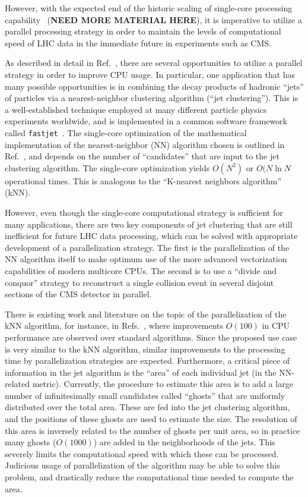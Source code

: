 \documentclass[12pt]{article}
\begin{document}
However, with the expected end of the historic scaling of single-core
processing capability~\cite{bergman2008exascale} ({\bf NEED MORE
  MATERIAL HERE}), it is imperative to utilize a parallel processing
strategy in order to maintain the levels of computational speed of LHC
data in the immediate future in experiments such as CMS.  

As described in detail in Ref.~\cite{cms_computing_whitepaper}, there
are several opportunities to utilize a parallel strategy in order to
improve CPU usage. In particular, one application that has many
possible opportunities is in combining the decay products of hadronic
``jets'' of particles via a nearest-neighbor clustering algorithm 
(``jet clustering''). This is a well-established technique employed at
many different particle physics experiments worldwide, and is
implemented in a common software framework called 
{\tt fastjet}~\cite{fastjet_manual}. The single-core optimization of
the mathematical implementation of the nearest-neighbor (NN) algorithm
chosen is outlined in Ref.~\cite{fastjet_timing}, and depends on the
number of ``candidates'' that are input to the jet clustering
algorithm. The single-core optimization yields $O(N^2)$ or 
$O(N \ln{N}$ operational times. This is analogous to the
``K-nearest neighbors algorithm''~\cite{knn_ieee} (kNN). 

However, even though the single-core computational strategy is
sufficient for many applications, there are two key components of 
jet clustering that are still inefficient for future LHC data
processing, which can be solved with appropriate development of a
parallelization strategy. The first is the
parallelization of the NN algorithm itself to make
optimum use of the more advanced vectorization capabilities of modern
multicore CPUs. The second is to use a ``divide and conquor'' strategy
to reconstruct a single collision event in several disjoint sections of
the CMS detector in parallel. 

There is existing work and literature on the topic of the
parallelization of the kNN algorithm, for instance, in
Refs.~\cite{knn_gpu_1, knn_gpu_2, knn_gpu_3}, where improvements
$O(100)$ in CPU performance are observed over standard
algorithms. Since the proposed use case is
very similar to the kNN algorithm, similar improvements to the
processing time by parallelization strategies are expected. 
Furthermore, 
a critical piece of information in the jet algorithm
is the ``area'' of each individual jet (in the NN-related
metric). Currently, the procedure to estimate this area is to add a
large number of infinitesimally small candidates called ``ghosts''
that are uniformly distributed over the total area. These are fed into
the jet clustering algorithm, and the positions of these ghosts are
used to estimate the size. The resolution of this area is inversely
related to the number of ghosts per unit area, so in practice many
ghosts ($O(1000)$) are added in the neighborhoods of the jets. 
This severely limits the computational speed with which these can be
processed. Judicious usage of parallelization of the algorithm may be
able to solve this problem, and drastically reduce the computational
time needed to compute the area. 
\end{document}
